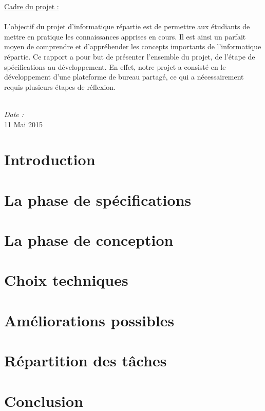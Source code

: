 \documentclass[a4paper,12pt]{report}
\begin{document}
\begin{titlepage}
    \large{\underline{Cadre du projet : }} \\ \\
    \normalsize{L'objectif du projet d'informatique répartie est de permettre aux étudiants de 
        mettre en pratique les connaissances apprises en cours. Il est ainsi un parfait moyen
        de comprendre et d'appréhender les concepts importants de l'informatique répartie. Ce rapport
        a pour but de présenter l'ensemble du projet, de l'étape de spécifications au développement. En effet, 
        notre projet a consisté en le développement d'une plateforme de bureau partagé, ce qui a 
        nécessairement requis plusieurs étapes de réflexion.} \\ \\
    \begin{center}
        \textit{Date :} \\ 11 Mai 2015
    \end{center}
\end{titlepage}

\tableofcontents

\chapter*{Introduction}


\chapter{La phase de spécifications}


\chapter{La phase de conception}


\chapter{Choix techniques}


\chapter{Améliorations possibles}


\chapter{Répartition des tâches}


\chapter*{Conclusion}

\end{document}
